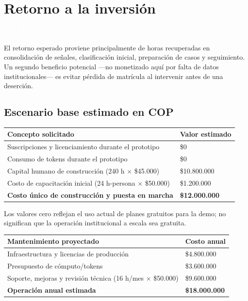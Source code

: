 \documentclass[11pt,letterpaper]{article}
\newcommand{\taglabel}[2]{%
  \noindent\colorbox{#1}{\parbox{\dimexpr\linewidth-2\fboxsep\relax}{\textcolor{white}{\textbf{#2}}}}\par
}
\newcommand{\question}[3]{%
  \section{#1}
  \taglabel{#2}{#3}
}
\begin{document}
\question{Retorno a la inversión}{utbblue}{L · ROI}

El retorno esperado proviene principalmente de horas
recuperadas en consolidación de señales, clasificación inicial, preparación de
casos y seguimiento. Un segundo beneficio potencial ---no monetizado aquí por
falta de datos institucionales--- es evitar pérdida de matrícula al intervenir
antes de una deserción.

\subsection*{Escenario base estimado en COP}

\begin{center}
\begin{tabularx}{\textwidth}{X >{\raggedleft\arraybackslash}p{}}
\toprule
\textbf{Concepto solicitado} & \textbf{Valor estimado}\\
\midrule
Suscripciones y licenciamiento durante el prototipo & \$0\\
Consumo de tokens durante el prototipo & \$0\\
Capital humano de construcción (240 h × \$45.000) & \$10.800.000\\
Costo de capacitación inicial (24 h-persona × \$50.000) & \$1.200.000\\
\midrule
\textbf{Costo único de construcción y puesta en marcha} & \textbf{\$12.000.000}\\
\bottomrule
\end{tabularx}
\end{center}

Los valores cero reflejan el uso actual de planes gratuitos para la demo; no
significan que la operación institucional a escala sea gratuita.

\begin{center}
\begin{tabularx}{\textwidth}{X >{\raggedleft\arraybackslash}p{}}
\toprule
\textbf{Mantenimiento proyectado} & \textbf{Costo anual}\\
\midrule
Infraestructura y licencias de producción & \$4.800.000\\
Presupuesto de cómputo/tokens & \$3.600.000\\
Soporte, mejoras y revisión técnica (16 h/mes × \$50.000) & \$9.600.000\\
\midrule
\textbf{Operación anual estimada} & \textbf{\$18.000.000}\\
\bottomrule
\end{tabularx}
\end{center}
\end{document}
